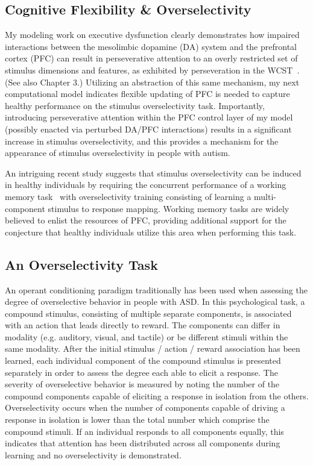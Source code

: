 \subsection{Cognitive Flexibility \& Overselectivity}
My modeling work on executive dysfunction clearly demonstrates how impaired interactions between the mesolimbic dopamine (DA) system and the prefrontal cortex (PFC) can result in perseverative attention to an overly restricted set of stimulus dimensions and features, as exhibited by perseveration in the WCST~\cite{KrieteT:2015:ED}.  (See also Chapter 3.)  Utilizing an abstraction of this same mechanism, my next computational model indicates flexible updating of PFC is needed to capture healthy performance on the stimulus overselectivity task.  Importantly, introducing perseverative attention within the PFC control layer of my model (possibly enacted via perturbed DA/PFC interactions) results in a significant increase in stimulus overselectivity, and this provides a mechanism for the appearance of stimulus overselectivity in people with autism.   

An intriguing recent study suggests that stimulus overselectivity can be induced in healthy individuals by requiring the concurrent performance of a working memory task~\cite{ReedP:2005:TaskLoad} with overselectivity training consisting of learning a multi-component stimulus to response mapping.  Working memory tasks are widely believed to enlist the resources of PFC, providing additional support for the conjecture that healthy individuals utilize this area when performing this task.

\subsection{An Overselectivity Task}
An operant conditioning paradigm traditionally has been used when assessing the degree of overselective behavior in people with ASD.  In this psychological task, a compound stimulus, consisting of multiple separate components, is associated with an action that leads directly to reward.  The components can differ in modality (e.g. auditory, visual, and tactile) or be different stimuli within the same modality.  After the initial stimulus / action / reward association has been learned, each individual component of the compound stimulus is presented separately in order to assess the degree each able to elicit a response.  The severity of overselective behavior is measured by noting the number of the compound components capable of eliciting a response in isolation from the others.  Overselectivity occurs when the number of components capable of driving a response in isolation is lower than the total number which comprise the compound stimuli.  If an individual responds to all components equally, this indicates that attention has been distributed across all components during learning and no overselectivity is demonstrated.   

